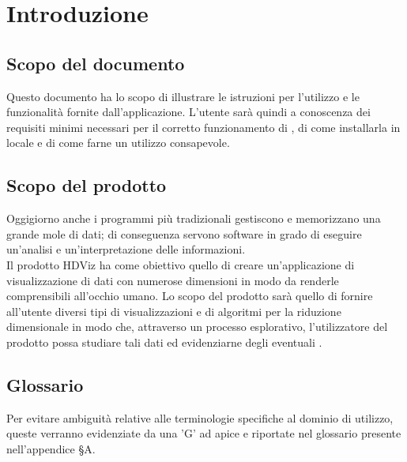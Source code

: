 \section{Introduzione}
\subsection{Scopo del documento}
Questo documento ha lo scopo di illustrare le istruzioni per l'utilizzo e le funzionalità fornite dall'applicazione. L'utente sarà quindi a conoscenza dei requisiti minimi necessari per il corretto funzionamento di \NomeProgetto{}, di come installarla in locale e di come farne un utilizzo consapevole.

\subsection{Scopo del prodotto}
Oggigiorno anche i programmi più tradizionali gestiscono e memorizzano una grande mole di dati; di conseguenza servono software in grado di eseguire un'analisi e un'interpretazione delle informazioni.\\
Il prodotto HDViz ha come obiettivo quello di creare un'applicazione di visualizzazione di dati con numerose dimensioni in modo da renderle comprensibili all'occhio umano.  Lo scopo del prodotto sarà quello di fornire all'utente diversi tipi di visualizzazioni e di algoritmi per la riduzione dimensionale in modo che, attraverso un processo esplorativo, l'utilizzatore del prodotto possa studiare tali dati ed evidenziarne degli eventuali . 

\subsection{Glossario}
Per evitare ambiguità relative alle terminologie specifiche al dominio di utilizzo, queste verranno evidenziate da una 'G' ad apice e riportate nel glossario presente nell'appendice \S A.

